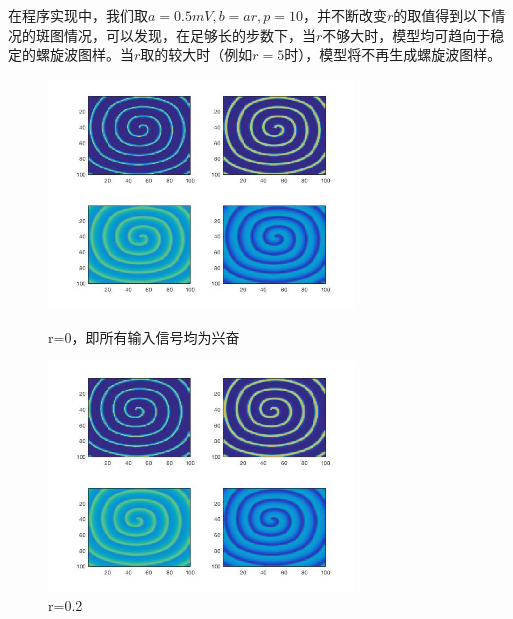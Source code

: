\documentclass[
    bachelor,
    nofont, %
    pdflinks,
    ]{xjtuthesis}
\begin{document}
在程序实现中，我们取$a=0.5mV, b=ar, p=10$，并不断改变$r$的取值得到以下情况的斑图情况，可以发现，在足够长的步数下，当$r$不够大时，模型均可趋向于稳定的螺旋波图样。当$r$取的较大时（例如$r=5$时），模型将不再生成螺旋波图样。

\begin{figure}[!ht]
\begin{minipage}[!ht]{0.5\linewidth}
\centering
\includegraphics[width=3.2in]{p10r0_1.jpg}
\caption{r=0，即所有输入信号均为兴奋}
\end{minipage}%
\begin{minipage}[!ht]{0.5\linewidth}
\centering
\includegraphics[width=3.2in]{p10r0_2_1.jpg}
\caption{r=0.2}
\end{minipage}
\end{figure}
\end{document}
